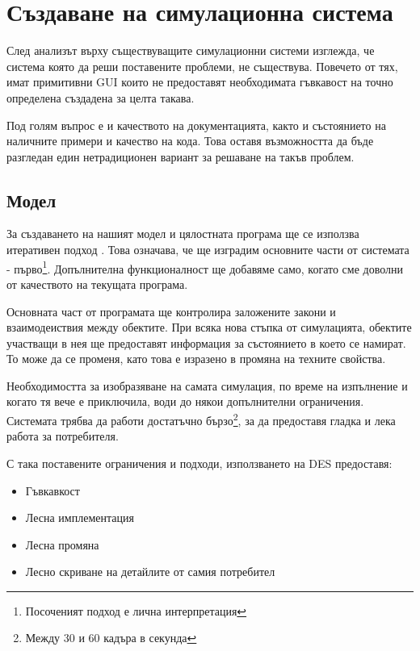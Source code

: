 \section{Създаване на симулационна система}
	
	След анализът върху съществуващите симулационни системи изглежда, че
	система която да реши поставените проблеми, не съществува.
	Повечето от тях, имат примитивни \ac{GUI} които не предоставят
	необходимата гъвкавост на точно определена създадена за целта такава.
	
	Под голям въпрос е и качеството на документацията, както и състоянието на
	наличните примери и качество на кода. Това оставя възможността да бъде разгледан
	един нетрадиционен вариант за решаване на такъв проблем.

	\subsection{Модел}
	
		За създаването на нашият модел и цялостната програма ще се използва итеративен подход \cite{ArtOfAgile}.
		Това означава, че ще изградим основните части от системата - 
		първо\footnote{Посоченият подход е лична интерпретация}. Допълнителна 
		функционалност ще добавяме само, когато сме доволни от качеството на текущата програма. 
				
		Основната част от програмата ще контролира заложените закони и взаимодеиствия	между обектите.
		При всяка нова стъпка от симулацията, обектите участващи в нея ще предоставят информация за
		състоянието в което се намират. То може да се променя, като това е изразено в промяна
		на техните свойства.
		
		Необходимостта за изобразяване на самата симулация, по време на изпълнение и когато тя вече е приключила,
		води до някои допълнителни ограничения. Системата трябва да работи достатъчно бързо\footnote{Между 30 и 60 кадъра в секунда},
		за да предоставя гладка и лека работа за потребителя.
		
		С така поставените ограничения и подходи, използването на \ac{DES} предоставя:
		
		\begin{itemize}
			\item Гъвкавкост
			
			\item Лесна имплементация
			
			\item Лесна промяна
			
			\item Лесно скриване на детайлите от самия потребител	
					
		\end{itemize}				
		
